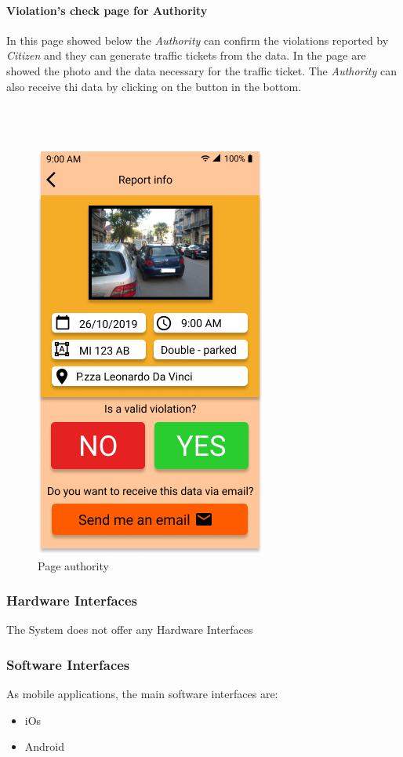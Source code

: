 \documentclass{article}
\begin{document}
\paragraph{Violation's check page for Authority}
In this page showed below the \textit{Authority} can confirm the violations reported by \textit{Citizen} and they can
generate traffic tickets from the data. In the page are showed the photo and the data necessary for the traffic ticket.
The \textit{Authority} can also receive thi data by clicking on the button in the bottom.
\\
\\
\\
\\ 
\begin{figure}[H]
    \centering
    \includegraphics[scale=0.5]{img/mockups/page_authority.png}
    \caption{Page authority}
\end{figure}

\subsubsection{Hardware Interfaces}
The System does not offer any Hardware Interfaces
\subsubsection{Software Interfaces}
As mobile applications, the main software interfaces are:
\begin{itemize}
    \item iOs
    \item Android
\end{itemize}
\end{document}
